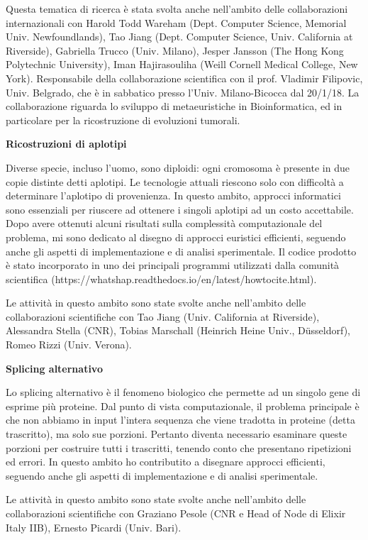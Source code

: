 \documentclass[11pt,a4paper,roman]{moderncv}        %
\begin{document}
  Questa tematica di ricerca è stata svolta anche nell'ambito delle
  collaborazioni internazionali con Harold Todd Wareham (Dept. Computer
  Science, Memorial Univ. Newfoundlands), Tao Jiang (Dept. Computer
  Science, Univ. California at Riverside), Gabriella Trucco (Univ.
  Milano), Jesper Jansson (The Hong Kong Polytechnic University), Iman
  Hajirasouliha (Weill Cornell Medical College, New York). Responsabile
  della collaborazione scientifica con il prof. Vladimir Filipovic, Univ.
  Belgrado, che è in sabbatico presso l'Univ. Milano-Bicocca dal 20/1/18.
  La collaborazione riguarda lo sviluppo di metaeuristiche in
  Bioinformatica, ed in particolare per la ricostruzione di evoluzioni
  tumorali.

  \textbf{Ricostruzioni di aplotipi}

  Diverse specie, incluso l'uomo, sono diploidi: ogni cromosoma è presente
  in due copie distinte detti aplotipi. Le tecnologie attuali riescono
  solo con difficoltà a determinare l'aplotipo di provenienza. In questo
  ambito, approcci informatici sono essenziali per riuscere ad ottenere i
  singoli aplotipi ad un costo accettabile. Dopo avere ottenuti alcuni
  risultati sulla complessità computazionale del problema, mi sono
  dedicato al disegno di approcci euristici efficienti, seguendo anche gli
  aspetti di implementazione e di analisi sperimentale. Il codice prodotto
  è stato incorporato in uno dei principali programmi utilizzati dalla
  comunità scientifica
  (https://whatshap.readthedocs.io/en/latest/howtocite.html).

  Le attività in questo ambito sono state svolte anche nell'ambito delle
  collaborazioni scientifiche con Tao Jiang (Univ. California at
  Riverside), Alessandra Stella (CNR), Tobias Marschall (Heinrich Heine
  Univ., Düsseldorf), Romeo Rizzi (Univ. Verona).

  \textbf{Splicing alternativo}

  Lo splicing alternativo è il fenomeno biologico che permette ad un
  singolo gene di esprime più proteine. Dal punto di vista computazionale,
  il problema principale è che non abbiamo in input l'intera sequenza che
  viene tradotta in proteine (detta trascritto), ma solo sue porzioni.
  Pertanto diventa necessario esaminare queste porzioni per costruire
  tutti i trascritti, tenendo conto che presentano ripetizioni ed errori.
  In questo ambito ho contributito a disegnare approcci efficienti,
  seguendo anche gli aspetti di implementazione e di analisi sperimentale.

  Le attività in questo ambito sono state svolte anche nell'ambito delle
  collaborazioni scientifiche con Graziano Pesole (CNR e Head of Node di
  Elixir Italy IIB), Ernesto Picardi (Univ. Bari).
\end{document}
